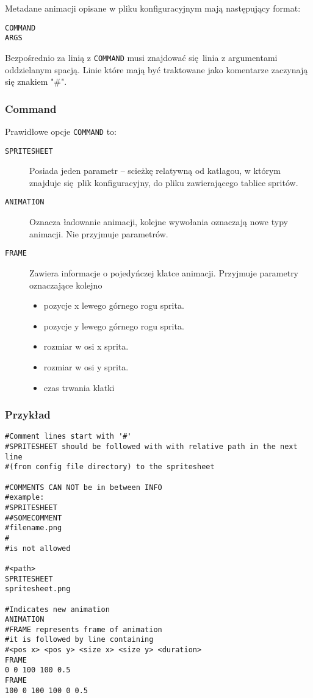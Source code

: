 \documentclass[11pt]{article}
\begin{document}
Metadane animacji opisane w pliku konfiguracyjnym mają następujący format:

\begin{verbatim}
COMMAND
ARGS
\end{verbatim}

Bezpośrednio za linią z \texttt{COMMAND} musi znajdować się linia z argumentami oddzielanym spacją.
Linie które mają być traktowane jako komentarze zaczynają się znakiem "\#".
\subsubsection{Command}
\label{sec:orgc8e5692}

Prawidłowe opcje \texttt{COMMAND} to:
\begin{description}
\item[{\texttt{SPRITESHEET}}] Posiada jeden parametr -- scieżkę relatywną od katlagou, w którym znajduje się plik konfiguracyjny, do pliku zawierającego tablice spritów.

\item[{\texttt{ANIMATION}}] Oznacza ładowanie animacji, kolejne wywołania oznaczają nowe typy animacji. Nie przyjmuje parametrów.

\item[{\texttt{FRAME}}] Zawiera informacje o pojedyńczej klatce animacji.
Przyjmuje parametry oznaczające kolejno
\begin{itemize}
\item pozycje x lewego górnego rogu sprita.
\item pozycje y lewego górnego rogu sprita.
\item rozmiar w osi x sprita.
\item rozmiar w osi y sprita.
\item czas trwania klatki
\end{itemize}
\end{description}
\subsubsection{Przykład}
\label{sec:org2f7f7a6}
\begin{verbatim}
#Comment lines start with '#'
#SPRITESHEET should be followed with with relative path in the next line
#(from config file directory) to the spritesheet

#COMMENTS CAN NOT be in between INFO
#example:
#SPRITESHEET
##SOMECOMMENT
#filename.png
#
#is not allowed

#<path>
SPRITESHEET
spritesheet.png

#Indicates new animation
ANIMATION
#FRAME represents frame of animation
#it is followed by line containing
#<pos x> <pos y> <size x> <size y> <duration>
FRAME
0 0 100 100 0.5
FRAME
100 0 100 100 0 0.5
\end{verbatim}
\end{document}
